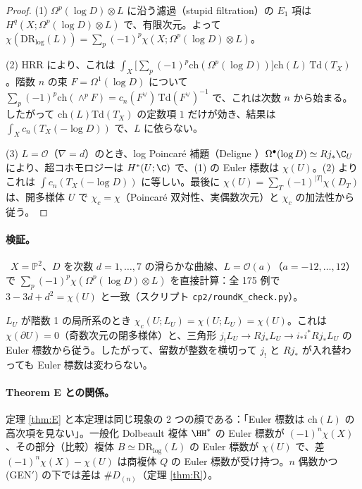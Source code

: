 \begin{proof}
(1) $\Omega^p(\log D)\otimes L$ に沿う濾過（stupid filtration）の $E_1$ 項は $H^q(X;\Omega^p(\log D)\otimes L)$ で、有限次元。よって $\chi(\mathrm{DR}_{\log}(L))=\sum_p(-1)^p\chi(X;\Omega^p(\log D)\otimes L)$。

(2) HRR により、これは $\int_X\bigl[\sum_p(-1)^p\mathrm{ch}(\Omega^p(\log D))\bigr]\mathrm{ch}(L)\,\mathrm{Td}(T_X)$。階数 $n$ の束 $F=\Omega^1(\log D)$ について $\sum_p(-1)^p\mathrm{ch}(\wedge^pF)=c_n(F^\vee)\,\mathrm{Td}(F^\vee)^{-1}$ で、これは次数 $n$ から始まる。したがって $\mathrm{ch}(L)\mathrm{Td}(T_X)$ の定数項 $1$ だけが効き、結果は $\int_Xc_n(T_X(-\log D))$ で、$L$ に依らない。

(3) $L=\mathcal O$（$\nabla=d$）のとき、log Poincar\'e 補題（Deligne \cite{Del70}）$\Omega^\bullet(\log D)\simeq Rj_*\C_U$ により、超コホモロジーは $H^*(U;\C)$ で、(1) の Euler 標数は $\chi(U)$。(2) よりこれは $\int c_n(T_X(-\log D))$ に等しい。最後に $\chi(U)=\sum_T(-1)^{|T|}\chi(D_T)$ は、開多様体 $U$ で $\chi_c=\chi$（Poincar\'e 双対性、実偶数次元）と $\chi_c$ の加法性から従う。
\end{proof}
\paragraph{検証。}\tV\ $X=\mathbb P^2$、$D$ を次数 $d=1,\dots,7$ の滑らかな曲線、$L=\mathcal O(a)$（$a=-12,\dots,12$）で $\sum_p(-1)^p\chi(\Omega^p(\log D)\otimes L)$ を直接計算：全 175 例で $3-3d+d^2=\chi(U)$ と一致（スクリプト \texttt{cp2/roundK\_check.py}）。

\begin{cor}[壁越えの恒等式\ \tP]\label{cor:wall}
$L_U$ が階数 1 の局所系のとき $\chi_c(U;L_U)=\chi(U;L_U)=\chi(U)$。これは $\chi(\partial U)=0$（奇数次元の閉多様体）と、三角形 $j_!L_U\to Rj_*L_U\to i_*i^*Rj_*L_U$ の Euler 標数から従う。したがって、留数が整数を横切って $j_!$ と $Rj_*$ が入れ替わっても Euler 標数は変わらない。
\end{cor}
\paragraph{Theorem E との関係。}定理 \ref{thm:E} と本定理は同じ現象の 2 つの顔である：「Euler 標数は $\mathrm{ch}(L)$ の高次項を見ない」。一般化 Dolbeault 複体 $\HH^*$ の Euler 標数が $(-1)^n\chi(X)$、その部分（比較）複体 $B\simeq\mathrm{DR}_{\log}(L)$ の Euler 標数が $\chi(U)$ で、差 $(-1)^n\chi(X)-\chi(U)$ は商複体 $Q$ の Euler 標数が受け持つ。$n$ 偶数かつ (GEN$'$) の下では差は $\#D_{(n)}$（定理 \ref{thm:R}）。

